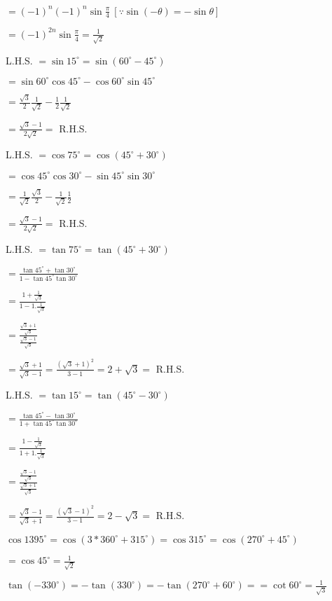   $= (-1)^n(-1)^n\sin \frac{\pi}{4}~[\because \sin(-\theta) = -\sin\theta]$

  $= (-1)^{2n}\sin \frac{\pi}{4} = \frac{1}{\sqrt{2}}$

\item L.H.S. $= \sin 15^\circ = \sin(60^\circ - 45^\circ)$

  $= \sin60^\circ\cos45^\circ - \cos60^\circ\sin45^\circ$

  $= \frac{\sqrt{3}}{2}\frac{1}{\sqrt{2}} - \frac{1}{2}\frac{1}{\sqrt{2}}$

  $= \frac{\sqrt{3} - 1}{2\sqrt{2}} =$ R.H.S.

\item L.H.S. $= \cos 75^\circ = \cos(45^\circ + 30^\circ)$

  $= \cos45^\circ\cos30^\circ - \sin45^\circ\sin30^\circ$

  $= \frac{1}{\sqrt{2}}\frac{\sqrt{3}}{2} - \frac{1}{\sqrt{2}}\frac{1}{2}$

  $= \frac{\sqrt{3} - 1}{2\sqrt{2}} =$ R.H.S.

\item L.H.S. $= \tan 75^\circ = \tan(45^\circ + 30^\circ)$

  $= \frac{\tan45^\circ + \tan30^\circ}{1 - \tan45^\circ\tan30^\circ}$

  $= \frac{1 + \frac{1}{\sqrt{3}}}{1 - 1.\frac{1}{\sqrt{3}}}$

  $= \frac{\frac{\sqrt{3} + 1}{\sqrt{3}}}{\frac{\sqrt{3} - 1}{\sqrt{3}}}$

  $= \frac{\sqrt{3} + 1}{\sqrt{3} - 1} = \frac{(\sqrt{3} + 1)^2}{3 - 1} = 2 + \sqrt{3} =$ R.H.S.

\item L.H.S. $= \tan 15^\circ = \tan(45^\circ - 30^\circ)$

  $= \frac{\tan45^\circ - \tan30^\circ}{1 + \tan45^\circ\tan30^\circ}$

  $= \frac{1 - \frac{1}{\sqrt{3}}}{1 + 1.\frac{1}{\sqrt{3}}}$

  $= \frac{\frac{\sqrt{3} - 1}{\sqrt{3}}}{\frac{\sqrt{3} + 1}{\sqrt{3}}}$

  $= \frac{\sqrt{3} - 1}{\sqrt{3} + 1} = \frac{(\sqrt{3} - 1)^2}{3 - 1} = 2 - \sqrt{3} =$ R.H.S.

\item $\cos 1395^\circ = \cos(3*360^\circ + 315^\circ) = \cos315^\circ = \cos(270^\circ + 45^\circ)$

  $= \cos45^\circ = \frac{1}{\sqrt{2}}$

\item $\tan(-330^\circ) = -\tan(330^\circ) = -\tan(270^\circ + 60^\circ) = =\cot 60^\circ = \frac{1}{\sqrt{3}}$

